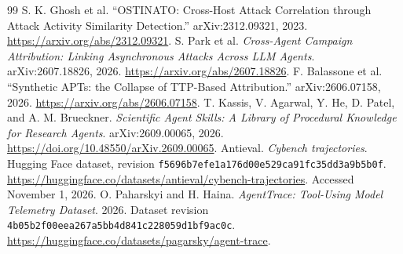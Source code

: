 \documentclass[10pt]{article}
\begin{document}
\begin{thebibliography}{99}
 S. K. Ghosh et al. ``OSTINATO: Cross-Host Attack Correlation through Attack Activity Similarity Detection.'' arXiv:2312.09321, 2023. \url{https://arxiv.org/abs/2312.09321}.
 S. Park et al. \emph{Cross-Agent Campaign Attribution: Linking Asynchronous Attacks Across LLM Agents}. arXiv:2607.18826, 2026. \url{https://arxiv.org/abs/2607.18826}.
 F. Balassone et al. ``Synthetic APTs: the Collapse of TTP-Based Attribution.'' arXiv:2606.07158, 2026. \url{https://arxiv.org/abs/2606.07158}.
 T. Kassis, V. Agarwal, Y. He, D. Patel, and A. M. Brueckner. \emph{Scientific Agent Skills: A Library of Procedural Knowledge for Research Agents}. arXiv:2609.00065, 2026. \url{https://doi.org/10.48550/arXiv.2609.00065}.
 Antieval. \emph{Cybench trajectories}. Hugging Face dataset, revision \texttt{f5696b7efe1a176d00e529ca91fc35dd3a9b5b0f}. \url{https://huggingface.co/datasets/antieval/cybench-trajectories}. Accessed November 1, 2026.
 O. Paharskyi and H. Haina. \emph{AgentTrace: Tool-Using Model Telemetry Dataset}. 2026. Dataset revision \texttt{4b05b2f00eea267a5bb4d841c228059d1bf9ac0c}. \url{https://huggingface.co/datasets/pagarsky/agent-trace}.
\end{thebibliography}
\end{document}
